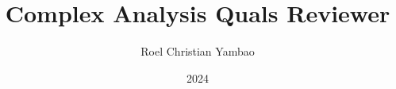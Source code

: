 \documentclass[11pt, letterpaper]{amsbook}
\title{Complex Analysis Quals Reviewer}
\author{Roel Christian Yambao}
\date{2024}
\theoremstyle{plain}
\theoremstyle{definition}
\begin{document}
\raggedbottom

\maketitle

\tableofcontents





% 
\end{document}

